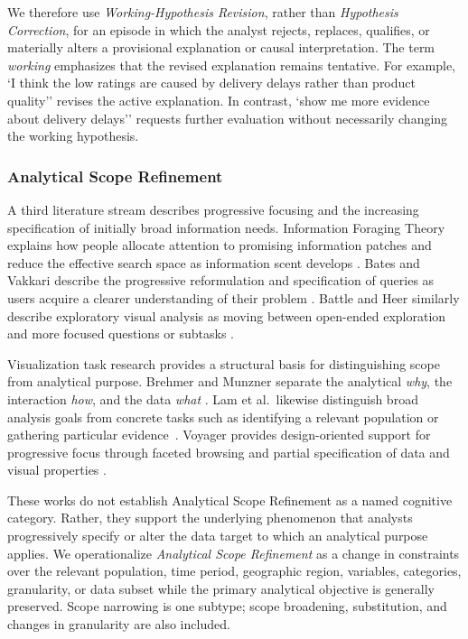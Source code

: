\documentclass[journal]{IEEEtran}
\begin{document}
We therefore use \emph{Working-Hypothesis Revision}, rather than
\emph{Hypothesis Correction}, for an episode in which the analyst rejects,
replaces, qualifies, or materially alters a provisional explanation or causal
interpretation. The term \emph{working} emphasizes that the revised explanation
remains tentative. For example, `I think the low ratings are caused by
delivery delays rather than product quality'' revises the active explanation.
In contrast, `show me more evidence about delivery delays'' requests further
evaluation without necessarily changing the working hypothesis.

\subsubsection{Analytical Scope Refinement}

A third literature stream describes progressive focusing and the increasing
specification of initially broad information needs. Information Foraging
Theory explains how people allocate attention to promising information patches
and reduce the effective search space as information scent develops
\cite{pirolli1999information}. Bates and Vakkari describe the progressive
reformulation and specification of queries as users acquire a clearer
understanding of their problem
\cite{bates1989berrypicking,vakkari2001changes}. Battle and Heer similarly
describe exploratory visual analysis as moving between open-ended exploration
and more focused questions or subtasks
\cite{battle2019characterizing}.

Visualization task research provides a structural basis for distinguishing
scope from analytical purpose. Brehmer and Munzner separate the analytical
\emph{why}, the interaction \emph{how}, and the data \emph{what}
\cite{brehmer2013multilevel}. Lam et al.\ likewise distinguish broad analysis
goals from concrete tasks such as identifying a relevant population or
gathering particular evidence~\cite{lam2018bridging}. Voyager provides
design-oriented support for progressive focus through faceted browsing and
partial specification of data and visual properties
\cite{wongsuphasawat2016voyager}.

These works do not establish Analytical Scope Refinement as a named cognitive
category. Rather, they support the underlying phenomenon that analysts
progressively specify or alter the data target to which an analytical purpose
applies. We operationalize \emph{Analytical Scope Refinement} as a change in
constraints over the relevant population, time period, geographic region,
variables, categories, granularity, or data subset while the primary
analytical objective is generally preserved. Scope narrowing is one subtype;
scope broadening, substitution, and changes in granularity are also included.
\end{document}
